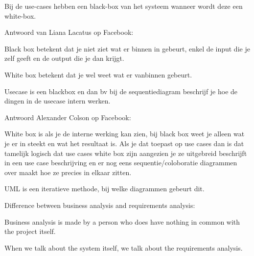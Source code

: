 \begin{question}
Bij de use-cases hebben een black-box van het systeem wanneer wordt deze een white-box.
\end{question}

\begin{solution}[print]

Antwoord van Liana Lacatus op Facebook:

Black box betekent dat je niet ziet wat er binnen in gebeurt, enkel de input die je zelf geeft en de output die je dan krijgt.

White box betekent dat je wel weet wat er vanbinnen gebeurt. 

Usecase is een blackbox en dan bv bij de sequentiediagram beschrijf je hoe de dingen in de usecase intern werken.

Antwoord Alexander Colson op Facebook:

 White box is als je de interne werking kan zien, bij black box weet je alleen wat je er in steekt en wat het resultaat is. Als je dat toepast op use cases dan is dat tamelijk logisch dat use cases white box zijn aangezien je ze uitgebreid beschrijft in een use case beschrijving en er nog eens sequentie/coloboratie diagrammen over maakt hoe ze precies in elkaar zitten.

\end{solution}

\begin{question}
UML is een iteratieve methode, bij welke diagrammen gebeurt dit.
\end{question}

\begin{solution}[print]

\end{solution}



\begin{question}
Difference between business analysis and requirements analysis:
\end{question}

\begin{solution}[print]
Business analysis is made by a person who does have nothing in common with the project itself.

When we talk about the system itself, we talk about the requirements analysis.
\end{solution}



